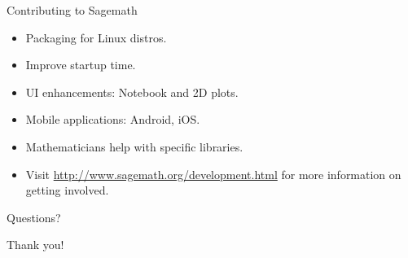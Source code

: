 \documentclass{beamer}
\begin{document}
\begin{frame}{Contributing to Sagemath}
 \begin{itemize}
  \item Packaging for Linux distros.
  \item Improve startup time.
  \item UI enhancements: Notebook and 2D plots.
  \item Mobile applications: Android, iOS.
  \item Mathematicians help with specific libraries.
  \item Visit \href{http://www.sagemath.org/development.html}{http://www.sagemath.org/development.html} for more information on getting involved.
 \end{itemize}
\end{frame}

\begin{frame}
  \begin{center}
    \HUGE Questions?
  \end{center}
\end{frame}

\begin{frame}
  \begin{center}
    \HUGE Thank you!
  \end{center}
\end{frame}
\end{document}
